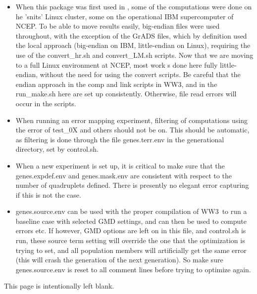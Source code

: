\documentclass[12pt]{article}
\newcommand{\ws}{WW3}
\newcommand{\file}{\sf}
\newcommand{\pb}{\strut \vfill \pagebreak}
\newcommand{\bpagea}{\strut

\vspace{2.5in} \centerline{This page is intentionally left blank.}}
\begin{document}
\begin{itemize}

\item When this package was first used in \citep{tol:MMABmanual}, some of the
  computations were done on he 'snits' Linux cluster, some on the operational
  IBM supercomputer of NCEP. To be able to move results easily, big-endian
  files were used throughout, with the exception of the GrADS files, which by
  definition used the local approach (big-endian on IBM, little-endian on
  Linux), requiring the use of the {\file convert\_hr.sh} and {\file
    convert\_LM.sh } scripts. Now that we are moving to a full Linux
  environment at NCEP, most work s done here fully little-endian, without the
  need for using the convert scripts. Be careful that the endian approach in
  the {\file comp} and {\file link} scripts in \ws, and in the {\file
    run\_make.sh} here are set up consistently. Otherwise, file read errors
  will occur in the scripts.

\item When running an error mapping experiment, filtering of computations
  using the error of {\file test\_0X} and others should not be on. This should
  be automatic, as filtering is done through the file {\file genes.terr.env}
  in the generational directory, set by {\file control.sh}.

\item When a new experiment is set up, it is critical to make sure that the
  {\file genes.expdef.env} and {\file genes.mask.env} are consistent with
  respect to the number of quadruplets defined. There is presently no elegant
  error capturing if this is not the case. 

\item {\file genes.source.env} can be used with the proper compilation of \ws\
  to run a baseline case with selected GMD settings, and can then be used to
  compute errors etc. If however, GMD options are left on in this file, and
  {\file control.sh} is run, these source term setting will override the one
  that the optimization is trying to set, and all population members will
  artificially get the same error (this will crash the generation of the next
  generation). So make sure {\file genes.source.env} is reset to all comment
  lines before trying to optimize again.
\end{itemize}

\pb
\pagestyle{empty}
\bpagea
\end{document}
